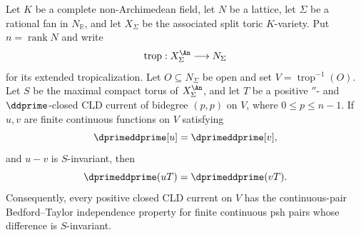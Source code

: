 \begin{proposition}
\label{prop:p213-invariant-split-toric-continuous-pairs-candidate}
Let $K$ be a complete non-Archimedean field, let $N$ be a lattice, let
$\Sigma$ be a rational fan in $N_{\mathbb R}$, and let $X_\Sigma$ be the
associated split toric $K$-variety.  Put $n=\operatorname{rank}N$ and write
\[
 \operatorname{trop}:X_\Sigma^{\An}\longrightarrow N_\Sigma
\]
for its extended tropicalization.  Let $O\subseteq N_\Sigma$ be open and set
$V=\operatorname{trop}^{-1}(O)$.  Let $S$ be the maximal compact torus of
$X_\Sigma^{\An}$, and let $T$ be a positive $\dprime$- and
$\ddprime$-closed CLD current of bidegree $(p,p)$ on $V$, where
$0\leq p\leq n-1$.  If $u,v$ are finite continuous functions on $V$ satisfying
\[
 \dprimeddprime[u]=\dprimeddprime[v],
\]
and $u-v$ is $S$-invariant, then
\[
 \dprimeddprime(uT)=\dprimeddprime(vT).
\]
Consequently, every positive closed CLD current on $V$ has the
continuous-pair Bedford--Taylor independence property for finite continuous
psh pairs whose difference is $S$-invariant.
\end{proposition}

